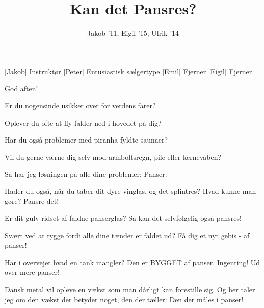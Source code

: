 \documentclass[a4paper,11pt]{article}
\title{Kan det Pansres?}
\author{Jakob '11, Eigil '15, Ulrik '14}
\begin{document}
\maketitle

\begin{roles}
[Jakob] Instruktør
[Peter] Entusiastisk sælgertype
[Emil] Fjerner
[Eigil] Fjerner
\end{roles}

\begin{props}
\end{props}


\begin{sketch}



 God aften! 

 Er du nogensinde usikker over for verdens farer?


 Oplever du ofte at fly falder ned i hovedet på dig?

 Har du også problemer med piranha fyldte saunaer?

 Vil du gerne værne dig selv mod armboltsregn, pile eller kernevåben? 

 Så har jeg løsningen på alle dine problemer: Panser. 


 Hader du også, når du taber dit dyre vinglas, og det splintres? Hvad kunne man gøre? Pansre det!

 Er dit gulv ridset af faldne panserglas? Så kan det selvfølgelig også pansres!

 Svært ved at tygge fordi alle dine tænder er faldet ud? Få dig et nyt gebis - af panser! 

 Har i overvejet hvad en tank mangler? Den er BYGGET af panser. Ingenting!  Ud over mere panser!

 Dansk metal vil opleve en vækst som man dårligt kan forestille sig. Og her taler jeg om den vækst der betyder noget, den der tæller:  Den der måles i panser!


\end{sketch}
\end{document}
